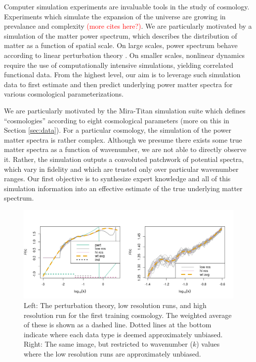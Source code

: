 \documentclass[11pt]{article}
\begin{document}
Computer simulation experiments are invaluable tools in the study of cosmology.
Experiments which simulate the expansion of the universe are growing
in prevalance and complexity \citep[e.g.,][]{lawrence2010coyote,moran2023mira}
\textcolor{red}{(more cites here?)}.  
We are particularly motivated by a simulation
of the matter power spectrum, which describes the distribution of matter as a 
function of spatial scale. 
On large scales, power spectrum behave according to linear perturbation 
theory \citep{pietroni2008flowing, lesgourgues2009non}.  On smaller scales, nonlinear 
dynamics require the use of computationally intensive simulations, yielding
correlated functional data.
From the highest level, our aim is to leverage such simulation data to 
first estimate and then predict underlying power matter spectra for various 
cosmological parameterizations.


We are particularly motivated by the Mira-Titan simulation suite \citep{moran2023mira}
which defines ``cosmologies'' according to eight cosmological parameters (more on this
in Section \ref{sec:data}).  For a particular cosmology, the simulation of the power matter spectra 
is rather complex.  Although we presume there exists some true matter spectra as a function
of wavenumber, we are not able to directly observe it.  Rather, the simulation outputs 
a convoluted patchwork of potential spectra, which vary in fidelity and which are trusted
only over particular wavenumber ranges.  Our first objective is to synthesize expert knowledge
and all of this simulation information into an effective estimate of the true underlying
matter spectrum.

\begin{figure}[ht]
    \centering
    \includegraphics[width=6in]{plot_data.png}
    \caption{Left: The perturbation theory, low resolution runs, and high resolution run 
             for the first training cosmology. The weighted average of these is shown as a dashed line. 
             Dotted lines at the bottom indicate where each data type is deemed approximately unbiased. 
             Right: The same image, but restricted to wavenumber ($k$) values where the low resolution 
             runs are approximately unbiased.}
    \label{fig:plot_data}
\end{figure}
\end{document}
